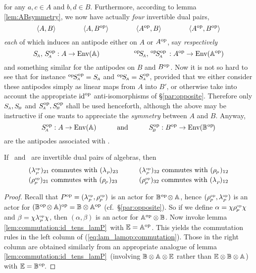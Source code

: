 for any $a,c \in A$ and $b,d \in B$. Furthermore, according to lemma \ref{lem:ABsymmetry},
we now have actually {\em four\/} invertible dual pairs,
$$ \pairAB           \hspace{4em}
   \pair{A}{B\op}    \hspace{4em}
   \pair{A\op}{B}    \hspace{4em}
   \pair{A\op}{B\op}$$
{\em each\/} of which induces an antipode either on $A$ or $A\op$, say {\em respectively}
$$ \SA, \, \SA\op : A \rarr \Env(\Aa)
         \hspace{5em}
   ^{\rm op}\!\SA, \, ^{\rm op}\!\SA\op \, : A\op \rarr \Env(\Aa\op) $$
and something similar for the antipodes on $B$ and $B\op$.
Now it is not so hard to see that for instance
$^{\rm op}\!\SA\op = \SA$ and $^{\rm op}\!\SA = \SA\op$,
provided that we either consider these antipodes simply as linear maps from
$A$ into $B'$, or otherwise take into account the appropriate $\id\op$
anti-isomorphisms of \S \ref{par:opposite}\@.
Therefore only $\SA, \SB$ and $\SA\op, \SB\op$ shall be used henceforth,
although the above may be instructive if one wants to
appreciate the {\em symmetry\/} between $A$ and $B$.
Anyway,
$$  \SA\op : A \rarr \Env(\Aa)         \andspace{3em}
    \SB\op : B\op \rarr \Env(\BBop)   $$
are the antipodes associated with \pairABop.


\begin{lemma_sec}
If\/ \pairAB\ and\/ \pairABop\ are invertible dual pairs of algebras, then
\begin{equation} \label{eq:lam_lamop:commutation}
\begin{array}{lcl}
(\lpop)_{21} \mbox{ commutes with\/ } (\lp)_{23}
& \hspace{1em} & (\lpop)_{32} \mbox{ commutes with\/ } (\rp)_{12}
\\
(\rpop)_{21} \mbox{ commutes with\/ } (\rp)_{23}
& \vertL & (\rpop)_{32} \mbox{ commutes with\/ } (\lp)_{12}
  \end{array}
\end{equation}
\end{lemma_sec}

\begin{proof}
Recall that $P\op = (\lpop,\rpop)$ is an actor for $\BBopAA$, hence
$(\rpop,\lpop)$ is an actor for $(\BBopAA)\op= \BB \tens \Aa\op$
(cf.\ \S \ref{par:opposite}). So if we define
$\alpha = \flip \rpop \flip$ and $\beta = \flip \lpop \flip$,
then $(\alpha,\beta)$ is an actor for $\Aa\op \tens \BB$.
Now invoke lemma \ref{lem:commutation:id_tens_lamP}\ with $\EE=\Aa\op$.
This yields the commutation rules in the left column of
(\ref{eq:lam_lamop:commutation}).
Those in the right column are obtained similarly from an appropriate
analogue of lemma \ref{lem:commutation:id_tens_lamP}\
(involving $\BBAA\tens\EE$ rather than $\EE\tens\BBAA$) with $\EE=\BBop$.
\end{proof}



